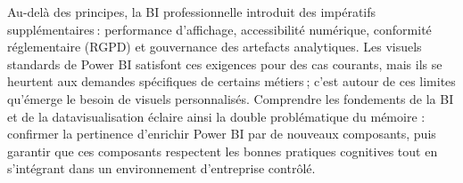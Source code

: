 Au-delà des principes, la BI professionnelle introduit des impératifs supplémentaires : performance d’affichage, accessibilité numérique, conformité réglementaire (RGPD) et gouvernance des artefacts analytiques. Les visuels standards de Power BI satisfont ces exigences pour des cas courants, mais ils se heurtent aux demandes spécifiques de certains métiers ; c’est autour de ces limites qu’émerge le besoin de visuels personnalisés. Comprendre les fondements de la BI et de la datavisualisation éclaire ainsi la double problématique du mémoire : confirmer la pertinence d’enrichir Power BI par de nouveaux composants, puis garantir que ces composants respectent les bonnes pratiques cognitives tout en s’intégrant dans un environnement d’entreprise contrôlé.

